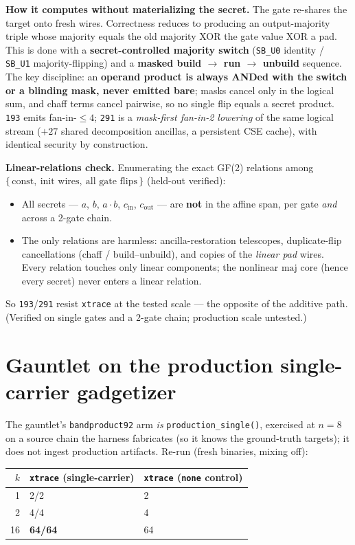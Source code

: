\documentclass[11pt]{article}
\newcommand{\code}[1]{\texttt{#1}}
\newcommand{\maj}{\mathrm{maj}}
\begin{document}
\textbf{How it computes without materializing the secret.} The gate re-shares the
target onto fresh wires. Correctness reduces to producing an output-majority triple
whose majority equals the old majority XOR the gate value XOR a pad. This is done
with a \textbf{secret-controlled majority switch} (\code{SB\_U0} identity /
\code{SB\_U1} majority-flipping) and a \textbf{masked build $\to$ run $\to$ unbuild}
sequence. The key discipline: an \textbf{operand product is always ANDed with the
switch or a blinding mask, never emitted bare}; masks cancel only in the logical
sum, and chaff terms cancel pairwise, so no single flip equals a secret product.
\code{193} emits fan-in-$\le 4$; \code{291} is a \emph{mask-first fan-in-2 lowering}
of the same logical stream ($+27$ shared decomposition ancillas, a persistent CSE
cache), with identical security by construction.

\textbf{Linear-relations check.} Enumerating the exact GF(2) relations among
$\{\,\text{const},\ \text{init wires},\ \text{all gate flips}\,\}$ (held-out verified):
\begin{itemize}
\item All secrets --- $a$, $b$, $a\!\cdot\!b$, $c_{\text{in}}$, $c_{\text{out}}$ ---
are \textbf{not} in the affine span, per gate \emph{and} across a 2-gate chain.
\item The only relations are harmless: ancilla-restoration telescopes, duplicate-flip
cancellations (chaff / build--unbuild), and copies of the \emph{linear pad} wires.
Every relation touches only linear components; the nonlinear $\maj$ core (hence every
secret) never enters a linear relation.
\end{itemize}
So \code{193}/\code{291} resist \code{xtrace} at the tested scale --- the opposite of
the additive path. (Verified on single gates and a 2-gate chain; production scale
untested.)

\section{Gauntlet on the production single-carrier gadgetizer}

The gauntlet's \code{bandproduct92} arm \emph{is} \code{production\_single()},
exercised at $n=8$ on a source chain the harness fabricates (so it knows the
ground-truth targets); it does not ingest production artifacts. Re-run (fresh
binaries, mixing off):

\begin{center}
\begin{tabular}{r l l}
\toprule
$k$ & \code{xtrace} (single-carrier) & \code{xtrace} (\code{none} control) \\
\midrule
1 & 2/2 & 2 \\
2 & 4/4 & 4 \\
16 & \textbf{64/64} & 64 \\
\bottomrule
\end{tabular}
\end{center}
\end{document}
